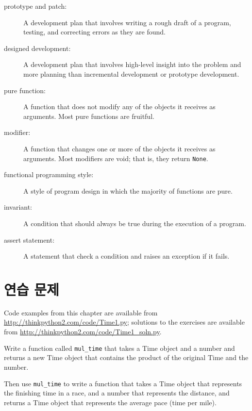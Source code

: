 \documentclass[10pt]{book}
\begin{document}
\begin{description}

\item[prototype and patch:] A development plan that involves
writing a rough draft of a program, testing, and correcting errors as
they are found.

\item[designed development:] A development plan that involves
high-level insight into the problem and more planning than incremental
development or prototype development.

\item[pure function:] A function that does not modify any of the objects it
receives as arguments.  Most pure functions are fruitful.

\item[modifier:] A function that changes one or more of the objects it
  receives as arguments.  Most modifiers are void; that is, they
  return {\tt None}.  

\item[functional programming style:] A style of program design in which the
majority of functions are pure.

\item[invariant:] A condition that should always be true during the
execution of a program.

\item[assert statement:] A statement that check a condition and raises
an exception if it fails.

\end{description}


\section{연습 문제}

Code examples from this chapter are available from
\url{http://thinkpython2.com/code/Time1.py}; solutions to the
exercises are available from \url{http://thinkpython2.com/code/Time1_soln.py}.

\begin{exercise}

Write a function called \verb"mul_time" that takes a Time object
and a number and returns a new Time object that contains
the product of the original Time and the number.

Then use \verb"mul_time" to write a function that takes a Time
object that represents the finishing time in a race, and a number
that represents the distance, and returns a Time object that represents
the average pace (time per mile).

\end{exercise}
\end{document}
